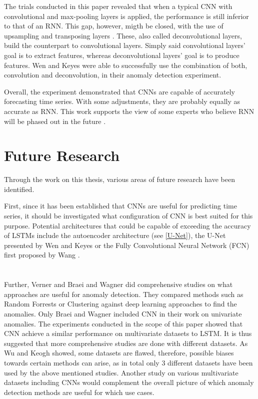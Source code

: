 The trials conducted in this paper revealed that when a typical CNN with convolutional and max-pooling layers is applied, the performance is still inferior to that of an RNN. This gap, however, migth be closed, with the use of upsampling and transposing layers \parencite{Wen2019}. These, also called deconvolutional layers, build the counterpart to convolutional layers. Simply said convolutional layers' goal is to extract features, whereas deconvolutional layers' goal is to produce features. Wen and Keyes \parencite*{Wen2019} were able to successfully use the combination of both, convolution and deconvolution, in their anomaly detection experiment.

Overall, the experiment demonstrated that CNNs are capable of accurately forecasting time series. With some adjustments, they are probably equally as accurate as RNN. This work supports the view of some experts who believe RNN will be phased out in the future \parencite{Culurciello2018} \parencite{Bai2018}. 

\section{Future Research}
Through the work on this thesis, various areas of future research have been identified.

First, since it has been established that CNNs are useful for predicting time series, it should be investigated what configuration of CNN is best suited for this purpose. Potential architectures that could be capable of exceeding the accuracy of LSTMs include the autoencoder architecture (see \ref{U-Net}), the U-Net presented by Wen and Keyes \parencite*{Wen2019} or the Fully Convolutional Neural Network (FCN) first proposed by Wang \parencite*{Wang2017}.\\
\\
\\
Further, Verner \parencite*{Verner2019} and Braei and Wagner \parencite*{Braei2020} did comprehensive studies on what approaches are useful for anomaly detection. They compared methods such as Random Forrests or Clustering against deep learning approaches to find the anomalies. Only Braei and Wagner \parencite*{Braei2020} included CNN in their work on univariate anomalies. The experiments conducted in the scope of this paper showed that CNN achieve a similar performance on multivariate datasets to LSTM. It is thus suggested that more comprehensive studies are done with different datasets. As Wu and Keogh \parencite*{Wu2020} showed, some datasets are flawed, therefore, possible biases towards certain methods can arise, as in total only 3 different datasets have been used by the above mentioned studies. Another study on various multivariate datasets including CNNs would complement the overall picture of which anomaly detection methods are useful for which use cases.







